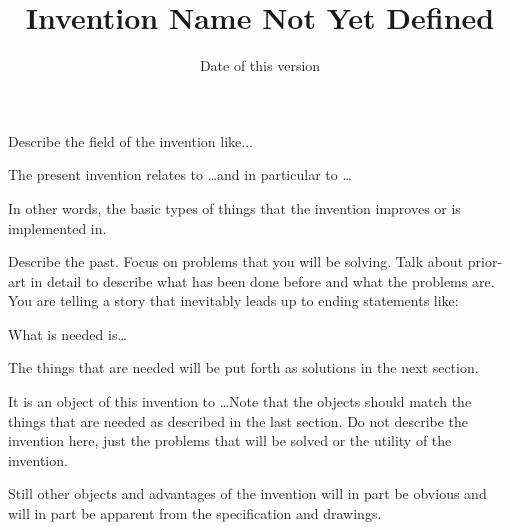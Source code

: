 \documentclass[english]{uspatent}
\begin{document}
\setPrintingModeApplication



\title{Invention Name Not Yet Defined}
\date{Date of this version}

\maketitle


\patentParagraph Describe the field of the invention like...

\patentParagraph The present invention relates to \ldots and in particular to \ldots

\patentParagraph In other words, the basic types of things that the invention improves or is implemented in.


\patentParagraph Describe the past. Focus on problems that you will be solving. Talk about prior-art in detail to describe what has been done before and what the problems are. You are telling a story that inevitably leads up to ending statements like:

\patentParagraph What is needed is\ldots

\patentParagraph The things that are needed will be put forth as solutions in the next section.


\patentParagraph It is an object of this invention to \ldots Note that the objects should match the things that are needed as described in the last section. Do not describe the invention here, just the problems that will be solved or the utility of the invention.

\patentParagraph Still other objects and advantages of the invention will in part be obvious and will in part be apparent from the specification and drawings.

\end{document}
